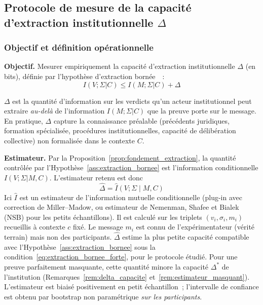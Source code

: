 \subsection{Protocole de mesure de la capacit\'e d'extraction institutionnelle $\Delta$}
\label{subsec:protocole_delta}
\begin{sloppypar}

\subsubsection{Objectif et d\'efinition op\'erationnelle}
\label{subsubsec:objectif_delta}

\noindent\textbf{Objectif.} Mesurer empiriquement la capacit\'e d'extraction
institutionnelle $\Delta$ (en bits), d\'efinie par l'hypoth\`ese d'extraction
born\'ee~\cite{MINKA2026CRO}~:
\begin{equation}
I(V;\Sigma|C) \leq I(M;\Sigma|C) + \Delta
\label{eq:extraction_bornee_op}
\end{equation}

\begin{definition}\label{def:capacite_extraction_op}
$\Delta$ est la quantit\'e d'information sur les verdicts qu'un acteur
institutionnel peut extraire \emph{au-del\`a} de l'information $I(M;\Sigma|C)$
que la preuve porte sur le message. En pratique, $\Delta$ capture la
connaissance pr\'ealable (pr\'ec\'edents juridiques, formation sp\'ecialis\'ee,
proc\'edures institutionnelles, capacit\'e de d\'elib\'eration collective) non
formalis\'ee dans le contexte $C$.
\end{definition}

\noindent\textbf{Estimateur.} Par la
Proposition~\ref{prop:fondement_extraction}, la quantit\'e contr\^ol\'ee par
l'Hypoth\`ese~\ref{ass:extraction_bornee} est l'information conditionnelle
$I(V;\Sigma|M,C)$. L'estimateur retenu est donc
\begin{equation}
\hat{\Delta} = \hat{I}(V;\Sigma \mid M, C)
\label{eq:estimateur_delta}
\end{equation}
Ici $\hat{I}$ est un estimateur de l'information mutuelle conditionnelle
(plug-in avec correction de Miller--Madow, ou estimateur de Nemenman, Shafee et Bialek (NSB) pour
les petits \'echantillons). Il est calcul\'e sur les triplets $(v_i, \sigma_i, m_i)$
recueillis \`a contexte $c$ fix\'e. Le message $m_i$ est connu de
l'exp\'erimentateur (v\'erit\'e terrain) mais non des participants. $\hat{\Delta}$ estime
la plus petite capacit\'e compatible avec l'Hypoth\`ese~\ref{ass:extraction_bornee}
sous la condition~\eqref{eq:extraction_bornee_forte}, pour le protocole \'etudi\'e. Pour
une preuve parfaitement masquante, cette quantit\'e minore la capacit\'e $\Delta^*$ de
l'institution (Remarques~\ref{rem:delta_capacite} et~\ref{rem:estimateur_masquant}). L'estimateur est biais\'e
positivement en petit \'echantillon~; l'intervalle de confiance est obtenu par
bootstrap non param\'etrique \emph{sur les participants}.


\end{sloppypar}
